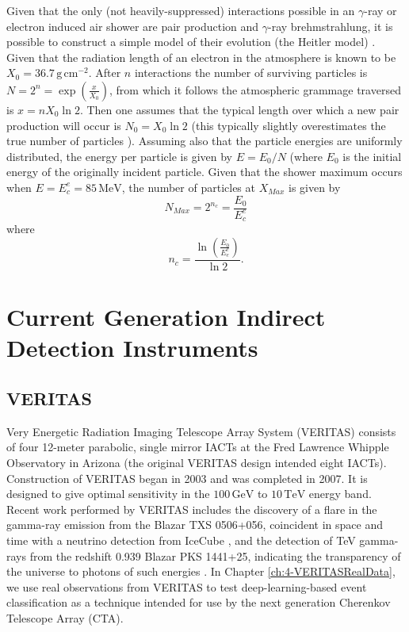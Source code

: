 Given that the only (not heavily-suppressed) interactions possible in an $\gamma$-ray or electron induced air shower are pair production and $\gamma$-ray brehmstrahlung, it is possible to construct a simple model of their evolution (the Heitler model) \cite{heitler}. Given that the radiation length of an electron in the atmosphere is known to be $X_0=\mathrm{36.7\,g\,cm^{-2}}$. After $n$ interactions the number of surviving particles is $N=2^n=\exp \left( \frac{x}{X_0}\right)$, from which it follows the atmospheric grammage traversed is $x=nX_0 \ln 2$. Then one assumes that the typical length over which a new pair production will occur is $N_0=X_0 \ln 2$ (this typically slightly overestimates the true number of particles \cite{heitlerquantum}). Assuming also that the particle energies are uniformly distributed, the energy per particle is given by $E=E_0/N$ (where $E_0$ is the initial energy of the originally incident particle. Given that the shower maximum occurs when $E=E_c^e=\mathrm{85\,MeV}$, the number of particles at $X_{Max}$ is given by \cite{heitler} 
\begin{equation}
    N_{Max}=2^{n_c}=\frac{E_0}{E_c^e}
\end{equation}
where 
\begin{equation}
n_c=\frac{\ln (\frac{E_0}{E_e^c})}{\ln 2}.
\end{equation}

\section{Current Generation Indirect Detection Instruments}
\subsection{VERITAS}
Very Energetic Radiation Imaging Telescope Array System (VERITAS) consists of four 12-meter parabolic, single mirror IACTs at the Fred Lawrence Whipple Observatory in Arizona (the original VERITAS design intended eight IACTs). Construction of VERITAS began in 2003 and was completed in 2007. It is designed to give optimal sensitivity in the $\mathrm{100\,GeV}$ to $\mathrm{10\,TeV}$ energy band. Recent work performed by VERITAS includes the discovery of a flare in the gamma-ray emission from the Blazar TXS 0506+056, coincident in space and time with a neutrino detection from IceCube \cite{TXS}, and the detection of TeV gamma-rays from the redshift 0.939 Blazar PKS 1441+25, indicating the transparency of the universe to photons of such energies \cite{escape}. In Chapter \ref{ch:4-VERITASRealData}, we use real observations from VERITAS to test deep-learning-based event classification as a technique intended for use by the next generation Cherenkov Telescope Array (CTA).

